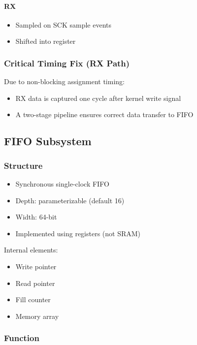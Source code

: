 \paragraph{RX}
\begin{itemize}
  \item Sampled on SCK sample events
  \item Shifted into register
\end{itemize}

\subsubsection{Critical Timing Fix (RX Path)}

Due to non-blocking assignment timing:
\begin{itemize}
  \item RX data is captured one cycle after kernel write signal
  \item A two-stage pipeline ensures correct data transfer to FIFO
\end{itemize}

\subsection{FIFO Subsystem}

\subsubsection{Structure}

\begin{itemize}
  \item Synchronous single-clock FIFO
  \item Depth: parameterizable (default 16)
  \item Width: 64-bit
  \item Implemented using registers (not SRAM)
\end{itemize}

Internal elements:
\begin{itemize}
  \item Write pointer
  \item Read pointer
  \item Fill counter
  \item Memory array
\end{itemize}

\subsubsection{Function}

